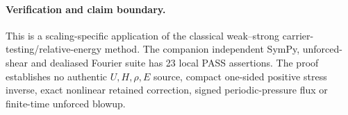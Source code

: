 \paragraph{Verification and claim boundary.}
This is a scaling-specific application of the classical weak--strong
carrier-testing/relative-energy method. The companion independent SymPy,
unforced-shear and dealiased Fourier suite has 23 local PASS assertions.
The proof establishes no authentic $U,H,\rho,E$ source, compact one-sided
positive stress inverse, exact nonlinear retained correction, signed
periodic-pressure flux or finite-time unforced blowup.

